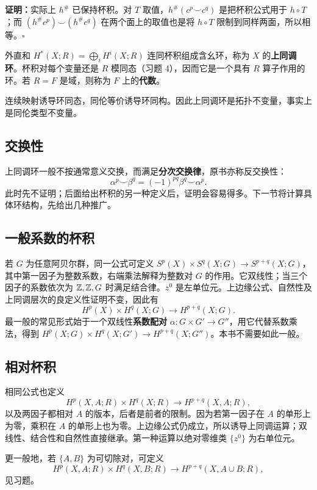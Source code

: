 \textbf{证明：}实际上 $h^\#$ 已保持杯积。对 $T$ 取值，$h^\#(c^p\smile c^q)$ 是把杯积公式用于 $h\circ T$；而 $(h^\#c^p)\smile(h^\#c^q)$ 在两个面上的取值也是将 $h\circ T$ 限制到同样两面，所以相等。\hfill$\square$

外直和 $H^*(X;R)=\bigoplus_iH^i(X;R)$ 连同杯积组成含幺环，称为 $X$ 的\textbf{上同调环}。杯积对每个变量还是 $R$ 模同态（习题 4），因而它是一个具有 $R$ 算子作用的环。若 $R=F$ 是域，则称为 $F$ 上的\textbf{代数}。

连续映射诱导环同态，同伦等价诱导环同构。因此上同调环是拓扑不变量，事实上是同伦类型不变量。

\subsection*{交换性}
上同调环一般不按通常意义交换，而满足\textbf{分次交换律}，原书亦称反交换性：
\[
\alpha^p\smile\beta^q=(-1)^{pq}\beta^q\smile\alpha^p.
\]
此时先不证明；后面给出杯积的另一种定义后，证明会容易得多。下一节将计算具体环结构，先给出几种推广。

\subsection*{一般系数的杯积}
若 $G$ 为任意阿贝尔群，同一公式可定义 $S^p(X)\times S^q(X;G)\to S^{p+q}(X;G)$，其中第一因子为整数系数，右端乘法解释为整数对 $G$ 的作用。它双线性；当三个因子的系数依次为 $\mathbb{Z},\mathbb{Z},G$ 时满足结合律。$z^0$ 是左单位元。上边缘公式、自然性及上同调层次的良定义性证明不变，因此有
\[
H^p(X)\times H^q(X;G)\to H^{p+q}(X;G).
\]
最一般的常见形式始于一个双线性\textbf{系数配对} $\alpha:G\times G'\to G''$，用它代替系数乘法，得到 $H^p(X;G)\times H^q(X;G')\to H^{p+q}(X;G'')$。本书不需要如此一般。

\subsection*{相对杯积}
相同公式也定义
\[
H^p(X,A;R)\times H^q(X;R)\to H^{p+q}(X,A;R),
\]
以及两因子都相对 $A$ 的版本，后者是前者的限制。因为若第一因子在 $A$ 的单形上为零，乘积在 $A$ 的单形上也为零。上边缘公式仍成立，所以诱导上同调运算；双线性、结合性和自然性直接继承。第一种运算以绝对零维类 $\{z^0\}$ 为右单位元。

更一般地，若 $\{A,B\}$ 为可切除对，可定义
\[
H^p(X,A;R)\times H^q(X,B;R)\to H^{p+q}(X,A\cup B;R),
\]
见习题。

